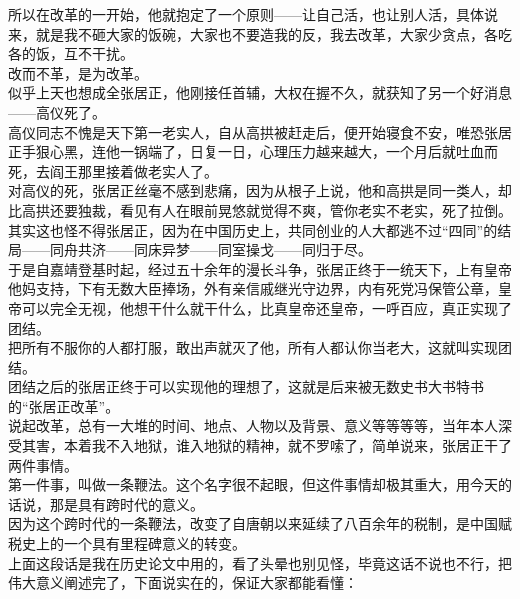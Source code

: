 \begin{multicols}{\theparacolNo}
所以在改革的一开始，他就抱定了一个原则——让自己活，也让别人活，具体说来，就是我不砸大家的饭碗，大家也不要造我的反，我去改革，大家少贪点，各吃各的饭，互不干扰。\\

改而不革，是为改革。\\

似乎上天也想成全张居正，他刚接任首辅，大权在握不久，就获知了另一个好消息——高仪死了。\\

高仪同志不愧是天下第一老实人，自从高拱被赶走后，便开始寝食不安，唯恐张居正手狠心黑，连他一锅端了，日复一日，心理压力越来越大，一个月后就吐血而死，去阎王那里接着做老实人了。\\

对高仪的死，张居正丝毫不感到悲痛，因为从根子上说，他和高拱是同一类人，却比高拱还要独裁，看见有人在眼前晃悠就觉得不爽，管你老实不老实，死了拉倒。\\

其实这也怪不得张居正，因为在中国历史上，共同创业的人大都逃不过“四同”的结局——同舟共济——同床异梦——同室操戈——同归于尽。\\

于是自嘉靖登基时起，经过五十余年的漫长斗争，张居正终于一统天下，上有皇帝他妈支持，下有无数大臣捧场，外有亲信戚继光守边界，内有死党冯保管公章，皇帝可以完全无视，他想干什么就干什么，比真皇帝还皇帝，一呼百应，真正实现了团结。\\

把所有不服你的人都打服，敢出声就灭了他，所有人都认你当老大，这就叫实现团结。\\

团结之后的张居正终于可以实现他的理想了，这就是后来被无数史书大书特书的“张居正改革”。\\

说起改革，总有一大堆的时间、地点、人物以及背景、意义等等等等，当年本人深受其害，本着我不入地狱，谁入地狱的精神，就不罗嗦了，简单说来，张居正干了两件事情。\\

第一件事，叫做一条鞭法。这个名字很不起眼，但这件事情却极其重大，用今天的话说，那是具有跨时代的意义。\\

因为这个跨时代的一条鞭法，改变了自唐朝以来延续了八百余年的税制，是中国赋税史上的一个具有里程碑意义的转变。\\

上面这段话是我在历史论文中用的，看了头晕也别见怪，毕竟这话不说也不行，把伟大意义阐述完了，下面说实在的，保证大家都能看懂：\\


\end{multicols}
